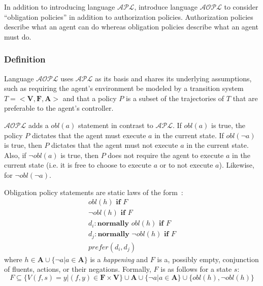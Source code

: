 In addition to introducing language $\mathcal{APL}$, \citet{gelfond_authorization_2008} introduce language $\mathcal{AOPL}$ to consider ``obligation policies'' in addition to authorization policies.
Authorization policies describe what an agent can do whereas obligation policies describe what an agent must do.

\subsubsection{Definition}

Language $\mathcal{AOPL}$ uses $\mathcal{APL}$ as its basis and shares its underlying assumptions, such as requiring the agent's environment be modeled by a transition system $T=<\boldsymbol{V}, \boldsymbol{F}, \boldsymbol{A}>$ and that a policy $P$ is a subset of the trajectories of $T$ that are preferable to the agent's controller.

$\mathcal{AOPL}$ adds a $obl(a)$ statement in contrast to $\mathcal{APL}$.
If $obl(a)$ is true, the policy $P$ dictates that the agent must execute $a$ in the current state.
If $obl(\neg a)$ is true, then $P$ dictates that the agent must not execute $a$ in the current state.
Also, if $\neg obl(a)$ is true, then $P$ does not require the agent to execute $a$ in the current state (i.e. it is free to choose to execute $a$ or to not execute $a$).
Likewise, for $\neg obl(\neg a)$.

\begin{definition}
    Obligation policy statements are static laws of the form~\citep{gelfond_authorization_2008}:
    \begin{gather}
        obl\left(h\right) \textbf{ if } F \\
        \neg obl\left(h\right) \textbf{ if } F \\
        d_i: \textbf{normally } obl(h) \textbf{ if } F \\
        d_j: \textbf{normally } \neg obl(h) \textbf{ if } F \\
        prefer(d_i, d_j)
    \end{gather}
    where $h \in \boldsymbol{A} \cup \{\neg a | a \in \boldsymbol{A}\}$ is a \textit{happening} and $F$ is a, possibly empty, conjunction of fluents, actions, or their negations.
    Formally, $F$ is as follows for a state $s$:
    \begin{equation}
        F\subseteq\{V(f,s)=y | (f, y) \in \boldsymbol{F} \times \boldsymbol{V}\} \cup \boldsymbol{A} \cup \{\neg a | a \in \boldsymbol{A}\} \cup \{obl(h), \neg obl(h)\}
    \end{equation}
\end{definition}

